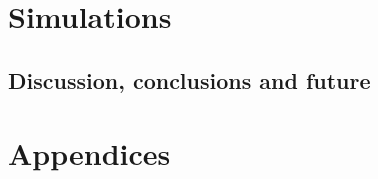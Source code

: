 \documentclass[twoside,english,a4paper,12pt]{uiofysmaster}
\begin{document}
\part{Simulations}
    
    
        
        
        \FloatBarrier
        
    
        
        
        \FloatBarrier
        
        
        
        \FloatBarrier
        
        
    
        \FloatBarrier
        
    
        
        \FloatBarrier
        
        \FloatBarrier
        
        \FloatBarrier
        
        
        \FloatBarrier

    \chapter{Discussion, conclusions and future}
        
        

\part{Appendices}
\begin{appendix}
    
    
\end{appendix}

\listoffigures
\listoftables
\listoflistings
\printbibliography

\listoftodos
\end{document}
